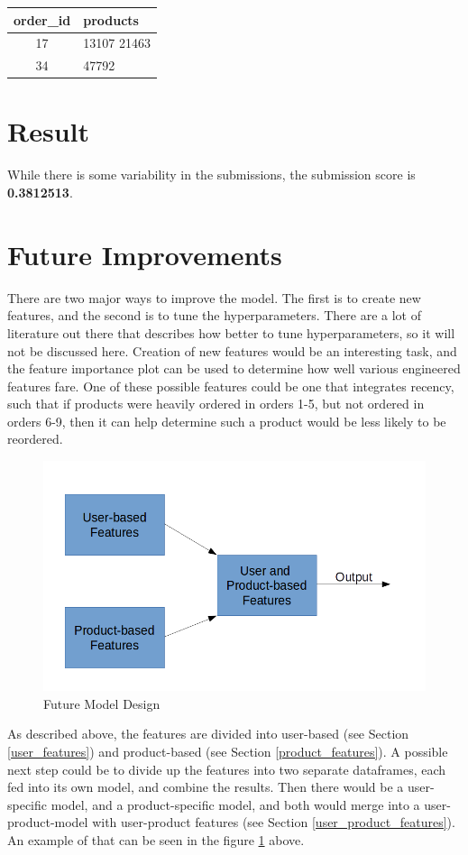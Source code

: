 \documentclass[12pt]{article}
\begin{document}
\begin{center}
\begin{tabular}{ c l }
 order\_id & products \\ 
 \hline
 17 & 13107 21463 \\  
 34 & 47792
\end{tabular}
\end{center}

\section{Result}
While there is some variability in the submissions, the submission score is \textbf{0.3812513}.

\section{Future Improvements}
There are two major ways to improve the model. The first is to create new features, and the second is to tune the hyperparameters. There are a lot of literature out there that describes how better to tune hyperparameters, so it will not be discussed here. Creation of new features would be an interesting task, and the feature importance plot can be used to determine how well various engineered features fare. One of these possible features could be one that integrates recency, such that if products were heavily ordered in orders 1-5, but not ordered in orders 6-9, then it can help determine such a product would be less likely to be reordered. 


\begin{figure}[H]
    \includegraphics[width=\linewidth]{future_model.png}
    \caption{Future Model Design}
    \label{fig:future_model}
\end{figure}

As described above, the features are divided into user-based (see Section \ref{user_features}) and product-based (see Section \ref{product_features}). A possible next step could be to divide up the features into two separate dataframes, each fed into its own model, and combine the results. Then there would be a user-specific model, and a product-specific model, and both would merge into a user-product-model with user-product features (see Section \ref{user_product_features}). An example of that can be seen in the figure \ref{fig:future_model} above.
\end{document}
